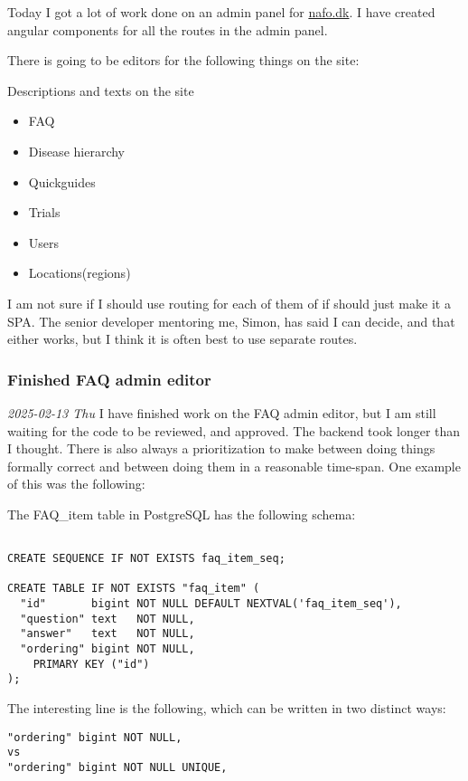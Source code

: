 \documentclass[../main.tex]{subfiles}
\begin{document}
Today I got a lot of work done on an admin panel for \href{https://www.nationaltforsoegsoverblik.dk/}{nafo.dk}. I have created angular components for all the routes in the admin panel.

There is going to be editors for the following things on the site:

Descriptions and texts on the site

\begin{itemize}
\item
  FAQ
\item
  Disease hierarchy
\item
  Quickguides
\item
  Trials
\item
  Users
\item
  Locations(regions)
\end{itemize}

I am not sure if I should use routing for each of them of if should just make it a SPA. The senior developer mentoring me, Simon, has said I can decide, and that either works, but I think it is often best to use separate routes.

\subsubsection{\textbf{Finished FAQ admin editor}}

\textit{2025-02-13 Thu} I have finished work on the FAQ admin editor, but I am still waiting for the code to be reviewed, and approved. The backend took longer than I thought. There is also always a prioritization to make between doing things formally correct and between doing them in a reasonable time-span. One example of this was the following:

The FAQ\_item table in PostgreSQL has the following schema:

\begin{verbatim}
    
CREATE SEQUENCE IF NOT EXISTS faq_item_seq;
  
CREATE TABLE IF NOT EXISTS "faq_item" ( 
  "id"       bigint NOT NULL DEFAULT NEXTVAL('faq_item_seq'),
  "question" text   NOT NULL,
  "answer"   text   NOT NULL,
  "ordering" bigint NOT NULL,
    PRIMARY KEY ("id")
);

\end{verbatim}

The interesting line is the following, which can be written in two distinct ways:

\begin{verbatim}
"ordering" bigint NOT NULL,
vs
"ordering" bigint NOT NULL UNIQUE,
\end{verbatim}
\end{document}
